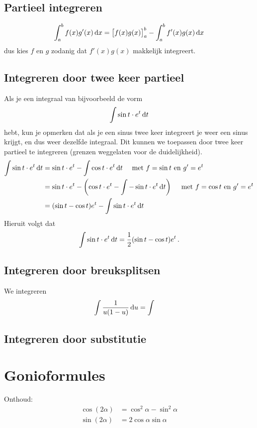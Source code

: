 \documentclass{article}
\begin{document}
        \subsection{Partieel integreren}
            \[
                \int_a^b f(x) g'(x) \mathop{}\!\mathrm{d} x = \big[f(x)g(x)\big]_a^b - \int_a^b f'(x) g(x) \mathop{}\!\mathrm{d} x
             \]
             dus kies $f$ en $g$ zodanig dat $f'(x)g(x)$ makkelijk integreert.

        \subsection{Integreren door twee keer partieel}
            Als je een integraal van bijvoorbeeld de vorm
            \[
                \int \sin t \cdot e^t \mathop{}\!\mathrm{d} t
            \]
            hebt, kun je opmerken dat als je een sinus twee keer integreert je weer een sinus
            krijgt, en dus weer dezelfde integraal. Dit kunnen we toepassen
            door twee keer partieel te integreren (grenzen weggelaten voor de duidelijkheid).
            \begin{align*}
                \int \sin t \cdot e^t \mathop{}\!\mathrm{d} t &= \sin t \cdot e^t - \int \cos t \cdot e^t \mathop{}\!\mathrm{d} t
                \quad \text{ met $f=\sin t$ en $g'=e^t$} \\
                &= \sin t \cdot e^t - \left( \cos t \cdot e^t - \int - \sin t \cdot e^t \mathop{}\!\mathrm{d} t \right)
                \quad \text{ met $f=\cos t$ en $g'=e^t$} \\
                &= ( \sin t - \cos t ) e^t -  \int \sin t \cdot e^t \mathop{}\!\mathrm{d} t
            \end{align*}
            Hieruit volgt dat
            \[  \int \sin t \cdot e^t \mathop{}\!\mathrm{d} t = \frac{1}{2} ( \sin t - \cos t ) e^t\,. \]

        \subsection{Integreren door breuksplitsen}
            We integreren
            \begin{align*}
                \int \frac{1}{u(1-u)} \mathop{}\!\mathrm{d} u &= \int \
            \end{align*}
        \subsection{Integreren door substitutie}
	 \section{Gonioformules}
		 Onthoud:
 		 \begin{align*}
 			 \cos (2\alpha) &= \cos^2 \alpha - \sin^2 \alpha \\
 			 \sin (2\alpha) &= 2 \cos \alpha \sin \alpha
 		 \end{align*}
 		 
\end{document}
